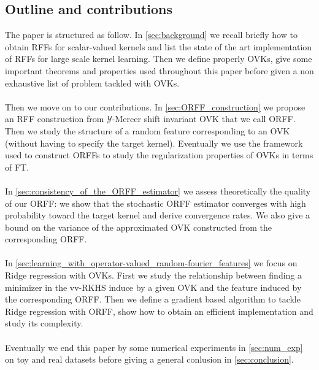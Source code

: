 \documentclass[twoside,11pt]{article}
\begin{document}
\subsection{Outline and contributions}
The paper is structured as follow. In \cref{sec:background} we recall briefly
how to obtain \acp{RFF} for scalar-valued kernels and list the state of the
art implementation of \acp{RFF} for large scale kernel learning. Then we define
properly \aclp{OVK}, give some important theorems and properties used
throughout this paper before given a non exhaustive list of problem tackled
with \acsp{OVK}.
\paragraph{}
Then we move on to our contributions. In \cref{sec:ORFF_construction} we
propose an \acs{RFF} construction from $\mathcal{Y}$-Mercer shift invariant
\acs{OVK} that we call \acf{ORFF}. Then we study the structure of a random
feature corresponding to an \acs{OVK} (without having to specify the target
kernel). Eventually we use the framework used to construct \acsp{ORFF} to study 
the regularization properties of \acsp{OVK} in terms of \acl{FT}.
\paragraph{}
In \cref{sec:consistency_of_the_ORFF_estimator} we assess theoretically the
quality of our \acs{ORFF}: we show that the stochastic \acs{ORFF} estimator
converges with high probability toward the target kernel and derive convergence
rates. We also give a bound on the variance of the approximated \acs{OVK}
constructed from the corresponding \acs{ORFF}.
\paragraph{}
In \cref{sec:learning_with_operator-valued_random-fourier_features} we focus on
Ridge regression with \acsp{OVK}. First we study the relationship between
finding a minimizer in the \acs{vv-RKHS} induce by a given \acs{OVK} and the
feature induced by the corresponding \acs{ORFF}. Then we define a gradient
based algorithm to tackle Ridge regression with \acs{ORFF}, show how to
obtain an efficient implementation and study its complexity.
\paragraph{}
Eventually we end this paper by some numerical experiments in
\cref{sec:num_exp} on toy and real datasets before giving a general conlusion
in  \cref{sec:conclusion}.
\end{document}

